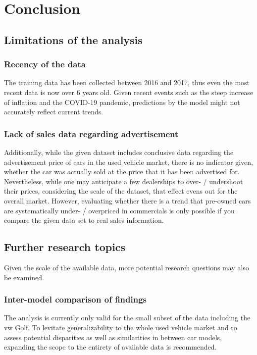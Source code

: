 \chapter{Conclusion}
\section{Limitations of the analysis}
\subsection{Recency of the data}
The training data has been collected between 2016 and 2017, thus even the most recent data
is now over 6 years old. Given recent events such as the steep increase of inflation
and the COVID-19 pandemic, predictions by the model might not accurately reflect current trends.

\subsection{Lack of sales data regarding advertisement}
Additionally, while the given dataset includes conclusive data regarding the advertisement price of cars in the used vehicle market,
there is no indicator given, whether the car was actually sold at the price that it has been advertised for. 
\newline
Nevertheless, while one may anticipate a few dealerships to over- / undershoot their prices,
considering the scale of the dataset, that effect evens out for the overall market.
However, evaluating whether there is a trend that pre-owned cars are systematically under- / overpriced in commercials
is only possible if you compare the given data set to real sales information.

\section{Further research topics}
Given the scale of the available data, more potential research questions may also be examined. 

\subsection{Inter-model comparison of findings}
The analysis is currently only valid for the small subset of the data including the \ac{vw} Golf. 
To levitate generalizability to the whole used vehicle market and to assess potential disparities as well as similarities in between 
car models, expanding the scope to the entirety of available data is recommended.  
